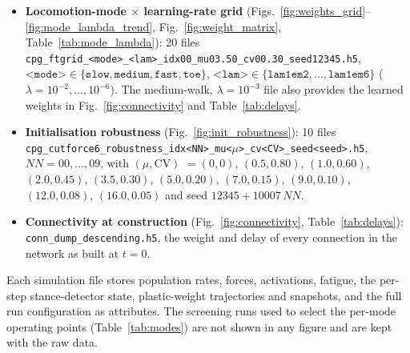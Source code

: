 \documentclass[11pt,letterpaper]{article}
\begin{document}
\begin{itemize}[leftmargin=*,itemsep=2pt]
  \item \textbf{Locomotion-mode $\times$ learning-rate grid} (Figs.~\ref{fig:weights_grid}--\ref{fig:mode_lambda_trend},
    Fig.~\ref{fig:weight_matrix}, Table~\ref{tab:mode_lambda}):
    20 files \texttt{cpg\_ftgrid\_<mode>\_<lam>\_idx00\_mu03.50\_cv00.30\_seed12345.h5},
    $\texttt{<mode>}\in\{\texttt{slow},\texttt{medium},\texttt{fast},\texttt{toe}\}$,
    $\texttt{<lam>}\in\{\texttt{lam1em2},\dots,\texttt{lam1em6}\}$
    ($\lambda=10^{-2},\dots,10^{-6}$). The medium-walk, $\lambda=10^{-3}$ file also
    provides the learned weights in Fig.~\ref{fig:connectivity} and Table~\ref{tab:delays}.
  \item \textbf{Initialisation robustness} (Fig.~\ref{fig:init_robustness}): 10 files
    \texttt{cpg\_cutforce6\_robustness\_idx<NN>\_mu<$\mu$>\_cv<CV>\_seed<seed>.h5},
    $NN=00,\dots,09$, with $(\mu,\mathrm{CV})$ $=(0,0)$, $(0.5,0.80)$, $(1.0,0.60)$,
    $(2.0,0.45)$, $(3.5,0.30)$, $(5.0,0.20)$, $(7.0,0.15)$, $(9.0,0.10)$,
    $(12.0,0.08)$, $(16.0,0.05)$ and seed $12345+10007\,NN$.
  \item \textbf{Connectivity at construction} (Fig.~\ref{fig:connectivity},
    Table~\ref{tab:delays}): \texttt{conn\_dump\_descending.h5}, the weight and delay
    of every connection in the network as built at $t=0$.
\end{itemize}

\noindent Each simulation file stores population rates, forces, activations,
fatigue, the per-step stance-detector state, plastic-weight trajectories and
snapshots, and the full run configuration as attributes. The screening runs used
to select the per-mode operating points (Table~\ref{tab:modes}) are not shown in
any figure and are kept with the raw data.


\end{document}
